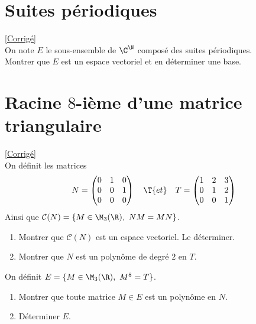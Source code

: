 \documentclass[8pt]{book}
\begin{document}
\section{Suites périodiques }
\label{Suites périodiques}
\textcolor{blue}{\hyperref[Suites périodiques corrigé]{[Corrigé]}}\\
On note $E$ le sous-ensemble de $\C^\N$ composé des suites périodiques.\\
Montrer que $E$ est un espace vectoriel et en déterminer une base.

\section{Racine $8$-ième d'une matrice triangulaire }
\label{Racine $8$-ième d'une matrice triangulaire}
\textcolor{blue}{\hyperref[Racine $8$-ième d'une matrice triangulaire corrigé]{[Corrigé]}}\\
On définit les matrices
$$N=\begin{pmatrix}
	0&1&0\\
	0&0&1\\
	0&0&0
\end{pmatrix}\quad\T{et}\quad T=\begin{pmatrix}
	1&2&3\\
	0&1&2\\
	0&0&1
\end{pmatrix}$$
Ainsi que $\mathcal C(N)=\{M\in \M_3(\R),\ NM=MN\}$.
\begin{enumerate}
	\item Montrer que $\mathcal C(N)$ est un espace vectoriel. Le déterminer.
	\item Montrer que $N$ est un polynôme de degré $2$ en $T$.
\end{enumerate}
On définit $E=\{M\in \M_3(\R),\ M^8=T\}$.
\begin{enumerate}[resume]
	\item Montrer que toute matrice $M\in E$ est un polynôme en $N$.
	\item Déterminer $E$.
\end{enumerate}
\end{document}
